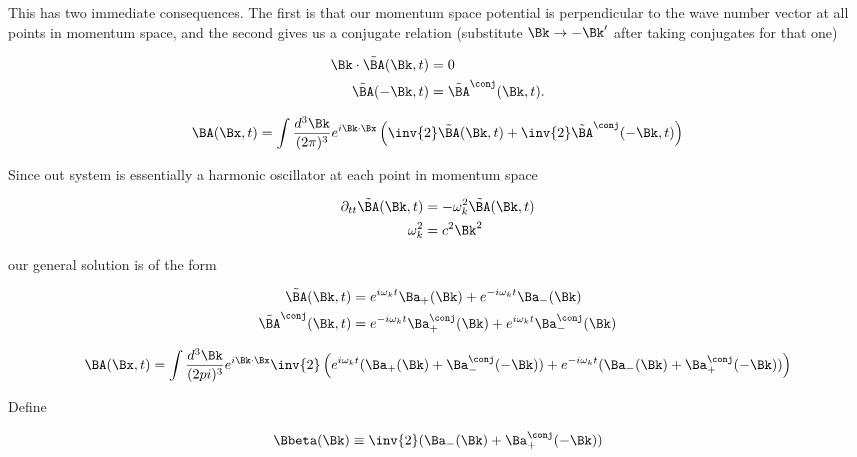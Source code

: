 This has two immediate consequences.  The first is that our momentum space potential is perpendicular to the wave number vector at all points in momentum space, and the second gives us a conjugate relation (substitute $\Bk \rightarrow -\Bk'$ after taking conjugates for that one)

\begin{align}\label{eqn:relativisticElectrodynamicsL15:590}
\Bk \cdot \tilde{\BA}(\Bk, t) &= 0 \\
\tilde{\BA}(-\Bk, t) &= \tilde{\BA}^\conj(\Bk, t).
\end{align}

\begin{equation}\label{eqn:relativisticElectrodynamicsL15:610}
\BA(\Bx, t) = \int 
\frac{d^3 \Bk}{(2\pi)^3} 
e^{i \Bk \cdot \Bx} \left( \inv{2} \tilde{\BA}(\Bk, t) + \inv{2} \tilde{\BA}^\conj(- \Bk, t) \right)
\end{equation}

Since out system is essentially a harmonic oscillator at each point in momentum space

\begin{align}\label{eqn:relativisticElectrodynamicsL15:630}
\partial_{tt} \tilde{\BA}(\Bk, t) &= - \omega_k^2 \tilde{\BA}(\Bk, t) \\
\omega_k^2 &= c^2 \Bk^2
\end{align}

our general solution is of the form

\begin{align}\label{eqn:relativisticElectrodynamicsL15:650}
\tilde{\BA}(\Bk, t) &= e^{i \omega_k t} \Ba_{+}(\Bk) +e^{-i \omega_k t} \Ba_{-}(\Bk) \\
\tilde{\BA}^\conj(\Bk, t) &= e^{-i \omega_k t} \Ba_{+}^\conj(\Bk) +e^{i \omega_k t} \Ba_{-}^\conj(\Bk)
\end{align}

\begin{equation}\label{eqn:relativisticElectrodynamicsL15:670}
\BA(\Bx, t) 
= \int \frac{d^3 \Bk}{(2 pi)^3} e^{i \Bk \cdot \Bx} 
\inv{2} \left( 
e^{i \omega_k t} (\Ba_{+}(\Bk) + \Ba_{-}^\conj(-\Bk)) 
+e^{-i \omega_k t} (\Ba_{-}(\Bk) + \Ba_{+}^\conj(-\Bk)) 
\right)
\end{equation}

Define

\begin{equation}\label{eqn:relativisticElectrodynamicsL15:690}
\Bbeta(\Bk) \equiv \inv{2} (\Ba_{-}(\Bk) + \Ba_{+}^\conj(-\Bk) )
\end{equation}

